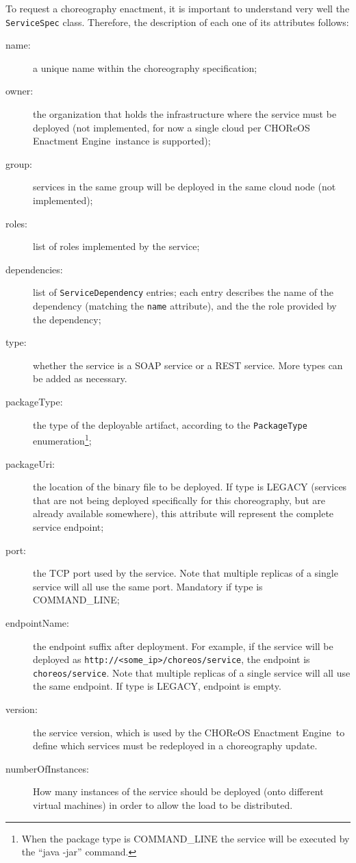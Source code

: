 \documentclass[a4paper, 10pt]{article}
\newcommand{\ee}{CHOReOS Enactment Engine}
\begin{document}
To request a choreography enactment, it is important to understand very well the \verb!ServiceSpec! class. Therefore, the description of each one of its attributes follows:

\begin{description}
\item [name:] a unique name within the choreography specification;
\item [owner:] the organization that holds the infrastructure where the service must be deployed (not implemented, for now a single cloud per \ee\ instance is supported);
\item [group:] services in the same group will be deployed in the same cloud node (not implemented);
\item [roles:] list of roles implemented by the service;
\item [dependencies:] list of \verb!ServiceDependency! entries; each entry describes the name of the dependency (matching the \verb!name! attribute), and the the role provided by the dependency;
\item [type:] whether the service is a SOAP service or a REST service. More types can be added as necessary.
\item [packageType:] the type of the deployable artifact, according to the \verb!PackageType! enumeration\footnote{When the package type is COMMAND\_LINE the service will be executed by the ``java -jar'' command.};
\item [packageUri:] the location of the binary file to be deployed. If type is LEGACY (services that are not being deployed specifically for this choreography, but are already available somewhere), this attribute will represent the complete service endpoint;
\item [port:] the TCP port used by the service. Note that multiple replicas of a single service will all use the same port. Mandatory if type is COMMAND\_LINE;
\item [endpointName:] the endpoint suffix after deployment. For example, if the service will be deployed as \verb!http://<some_ip>/choreos/service!, the endpoint is \verb!choreos/service!. Note that multiple replicas of a single service will all use the same endpoint. If type is LEGACY, endpoint is empty.
\item [version:] the service version, which is used by the \ee\ to define which services must be redeployed in a choreography update.
\item [numberOfInstances:] How many instances of the service should be deployed (onto different virtual machines) in order to allow the load to be distributed.
\end{description}
\end{document}
